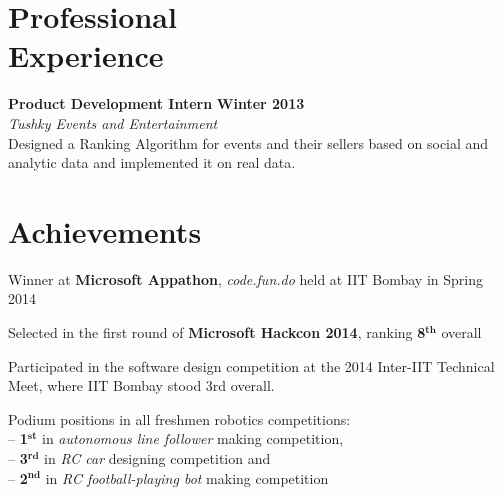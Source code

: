 \documentclass[margin,11pt]{resume}
\begin{document}
\begin{resume}
\section{\mysidestyle Professional \\ Experience}
\textbf{Product Development Intern} \hfill \textbf{Winter 2013}\\
\textsl{Tushky Events and Entertainment}\\
Designed a Ranking Algorithm for events and their sellers based on social and analytic data and implemented it on real data.

\section{\mysidestyle Achievements}
\begin{list2}
\item Winner at \textbf{Microsoft Appathon}, \textsl{code.fun.do} held at IIT Bombay in Spring 2014
\item Selected in the first round of \textbf{Microsoft Hackcon 2014}, ranking \textbf{8$^{\textbf{th}}$} overall
\item Participated in the software design competition at the 2014 Inter-IIT Technical Meet, where IIT Bombay stood 3rd overall.
\item Podium positions in all freshmen robotics competitions: \\
-- \textbf{1$^{\textbf{st}}$} in \textsl{autonomous line follower} making competition,\\ -- \textbf{3$^{\textbf{rd}}$} in \textsl{RC car} designing competition and\\ 
-- \textbf{2$^{\textbf{nd}}$} in \textsl{RC football-playing bot} making competition
\end{list2}


\end{resume}
\end{document}
